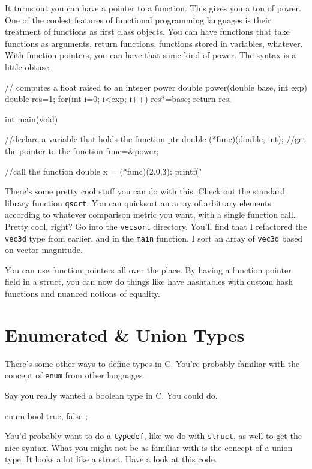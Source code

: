 \documentclass[ebook,11pt,oneside,openany]{memoir}
\newcommand{\cf}[1]{\texttt{#1}}
\begin{document}
It turns out you can have a pointer to a function. This gives you a ton of power. One of the coolest features of functional programming languages is their treatment of functions as first class objects. You can have functions that take functions as arguments, return functions, functions stored in variables, whatever. With function pointers, you can have that same kind of power. The syntax is a little obtuse.

\begin{code}[language=C]
// computes a float raised to an integer power
double power(double base, int exp)
{
  double res=1;
  for(int i=0; i<exp; i++) {
    res*=base;
  }
  return res;
}

int main(void)
{
  //declare a variable that holds the function ptr
  double (*func)(double, int);
  //get the pointer to the function
  func=&power;
  
  //call the function
  double x = (*func)(2.0,3);
  printf("%
  
}
\end{code}

There's some pretty cool stuff you can do with this. Check out the standard library function \cf{qsort}. You can quicksort an array of arbitrary elements according to whatever comparison metric you want, with a single function call. Pretty cool, right? Go into the \cf{vecsort} directory. You'll find that I refactored the \cf{vec3d} type from earlier, and in the \cf{main} function, I sort an array of \cf{vec3d} based on vector magnitude. 

You can use function pointers all over the place. By having a function pointer field in a struct, you can now do things like have hashtables with custom hash functions and nuanced notions of equality.

\section{Enumerated \& Union Types}

There's some other ways to define types in C. You're probably familiar with the concept of \cf{enum} from other languages.

Say you really wanted a boolean type in C. You could do.

\begin{code}[language=C]
enum bool {
  true,
  false
};
\end{code}

You'd probably want to do a \cf{typedef}, like we do with \cf{struct}, as well to get the nice syntax. What you might not be as familiar with is the concept of a union type. It looks a lot like a struct. Have a look at this code.
\end{document}

